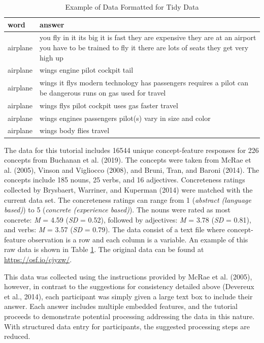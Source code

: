 \documentclass[man]{apa6}
\begin{document}
\begin{table}[t]

\caption{\label{tab:tab1}Example of Data Formatted for Tidy Data}
\centering
\begin{tabular}{l>{\raggedright\arraybackslash}p{30em}}
\toprule
word & answer\\
\midrule
airplane & you fly in it  its big  it is fast  they are expensive  they are at an airport  you have to be trained to fly it  there are lots of seats  they get very high up\\
airplane & wings engine pilot cockpit tail\\
airplane & wings  it flys  modern technology  has passengers  requires a pilot  can be dangerous  runs on gas  used for travel\\
airplane & wings  flys  pilot  cockpit  uses gas  faster travel\\
airplane & wings  engines  passengers  pilot(s)  vary in size and color\\
\addlinespace
airplane & wings  body  flies  travel\\
\bottomrule
\end{tabular}
\end{table}

The data for this tutorial includes 16544 unique concept-feature responses for 226 concepts from Buchanan et al. (2019). The concepts were taken from McRae et al. (2005), Vinson and Vigliocco (2008), and Bruni, Tran, and Baroni (2014). The concepts include 185 nouns, 25 verbs, and 16 adjectives. Concreteness ratings collected by Brysbaert, Warriner, and Kuperman (2014) were matched with the current data set. The concreteness ratings can range from 1 (\emph{abstract (language based)}) to 5 (\emph{concrete (experience based)}). The nouns were rated as most concrete: \emph{M} = 4.59 (\emph{SD} = 0.52), followed by adjectives: \emph{M} = 3.78 (\emph{SD} = 0.81), and verbs: \emph{M} = 3.57 (\emph{SD} = 0.79). The data consist of a text file where concept-feature observation is a row and each column is a variable. An example of this raw data is shown in Table \ref{tab:tab1}. The original data can be found at \url{https://osf.io/cjyzw/}.

This data was collected using the instructions provided by McRae et al. (2005), however, in contrast to the suggestions for consistency detailed above (Devereux et al., 2014), each participant was simply given a large text box to include their answer. Each answer includes multiple embedded features, and the tutorial proceeds to demonstrate potential processing addressing the data in this nature. With structured data entry for participants, the suggested processing steps are reduced.
\end{document}
